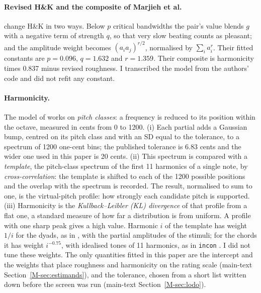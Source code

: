 \documentclass[11pt,a4paper]{article}
\newcommand{\HK}{H\&K}
\begin{document}
\paragraph{Revised \HK{} and the composite of Marjieh et al.}
\citet{marjieh2024} change \HK{} in two ways. Below $p$ critical bandwidths the pair's value
blends $g$ with a negative term of strength $q$, so that very slow beating counts as pleasant;
and the amplitude weight becomes $(a_ia_j)^{r/2}$, normalised by $\sum_i a_i^{r}$. Their
fitted constants are $p=0.096$, $q=1.632$ and $r=1.359$. Their composite is harmonicity times
0.837 minus revised roughness. I transcribed the model from the authors' code
\citep{marjieh2024code} and did not refit any constant.

\paragraph{Harmonicity.}
The model of \citet{harrison2018,harrison2020} works on \emph{pitch classes}: a frequency is
reduced to its position within the octave, measured in cents from 0 to 1200. (i) Each partial
adds a Gaussian bump, centred on its pitch class and with an SD equal to the tolerance, to a
spectrum of 1200 one-cent bins; the published tolerance is 6.83 cents and the wider one used
in this paper is 20 cents. (ii) This spectrum is compared with a \emph{template}, the
pitch-class spectrum of the first 11 harmonics of a single note, by \emph{cross-correlation}:
the template is shifted to each of the 1200 possible positions and the overlap with the
spectrum is recorded. The result, normalised to sum to one, is the virtual-pitch profile: how
strongly each candidate pitch is supported. (iii) Harmonicity is the
\emph{Kullback--Leibler (KL) divergence} of that profile from a flat one, a standard measure of
how far a distribution is from uniform. A profile with one sharp peak gives a high value.
Harmonic $i$ of the template has weight $1/i$ for the dyads, as in \citet{marjieh2024}, with
the partial amplitudes of the stimuli; for the chords it has weight $i^{-0.75}$, with
idealised tones of 11 harmonics, as in \texttt{incon} \citep{incon}. I did not tune these
weights. The only quantities fitted in this paper are the intercept and the weights that
place roughness and harmonicity on the rating scale (main-text Section~\ref{M-sec:estimands}),
and the tolerance, chosen from a short list written down before the screen was run (main-text
Section~\ref{M-sec:lodo}).
\end{document}

